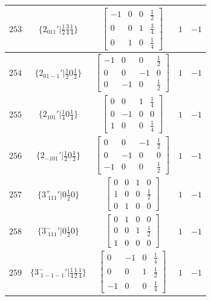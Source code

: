\documentclass[fleqn,8pt]{jsarticle}
\begin{document}
\begin{longtable}{ccccc}
$ 253 $ & $ \{2{}_{011}{}'|\frac{1}{2} \frac{3}{4} \frac{1}{4}\} $ & $ \begin{bmatrix} -1 & 0 & 0 & \frac{1}{2} \\ 0 & 0 & 1 & \frac{3}{4} \\ 0 & 1 & 0 & \frac{1}{4} \end{bmatrix} $ & $ 1 $ & $ -1 $ \\ \hline
$ 254 $ & $ \{2{}_{01-1}{}'|\frac{1}{2} 0 \frac{1}{2}\} $ & $ \begin{bmatrix} -1 & 0 & 0 & \frac{1}{2} \\ 0 & 0 & -1 & 0 \\ 0 & -1 & 0 & \frac{1}{2} \end{bmatrix} $ & $ 1 $ & $ -1 $ \\ \hline
$ 255 $ & $ \{2{}_{101}{}'|\frac{1}{4} 0 \frac{1}{4}\} $ & $ \begin{bmatrix} 0 & 0 & 1 & \frac{1}{4} \\ 0 & -1 & 0 & 0 \\ 1 & 0 & 0 & \frac{1}{4} \end{bmatrix} $ & $ 1 $ & $ -1 $ \\ \hline
$ 256 $ & $ \{2{}_{-101}{}'|\frac{1}{2} 0 \frac{1}{2}\} $ & $ \begin{bmatrix} 0 & 0 & -1 & \frac{1}{2} \\ 0 & -1 & 0 & 0 \\ -1 & 0 & 0 & \frac{1}{2} \end{bmatrix} $ & $ 1 $ & $ -1 $ \\ \hline
$ 257 $ & $ \{3^{+}_{\,\,111}{}'|0 \frac{1}{2} 0\} $ & $ \begin{bmatrix} 0 & 0 & 1 & 0 \\ 1 & 0 & 0 & \frac{1}{2} \\ 0 & 1 & 0 & 0 \end{bmatrix} $ & $ 1 $ & $ -1 $ \\ \hline
$ 258 $ & $ \{3^{-}_{\,\,111}{}'|0 \frac{1}{2} 0\} $ & $ \begin{bmatrix} 0 & 1 & 0 & 0 \\ 0 & 0 & 1 & \frac{1}{2} \\ 1 & 0 & 0 & 0 \end{bmatrix} $ & $ 1 $ & $ -1 $ \\ \hline
$ 259 $ & $ \{3^{-}_{\,\,1-1-1}{}'|\frac{1}{4} \frac{1}{2} \frac{1}{4}\} $ & $ \begin{bmatrix} 0 & -1 & 0 & \frac{1}{4} \\ 0 & 0 & 1 & \frac{1}{2} \\ -1 & 0 & 0 & \frac{1}{4} \end{bmatrix} $ & $ 1 $ & $ -1 $ \\ \hline

\end{longtable}
\end{document}
